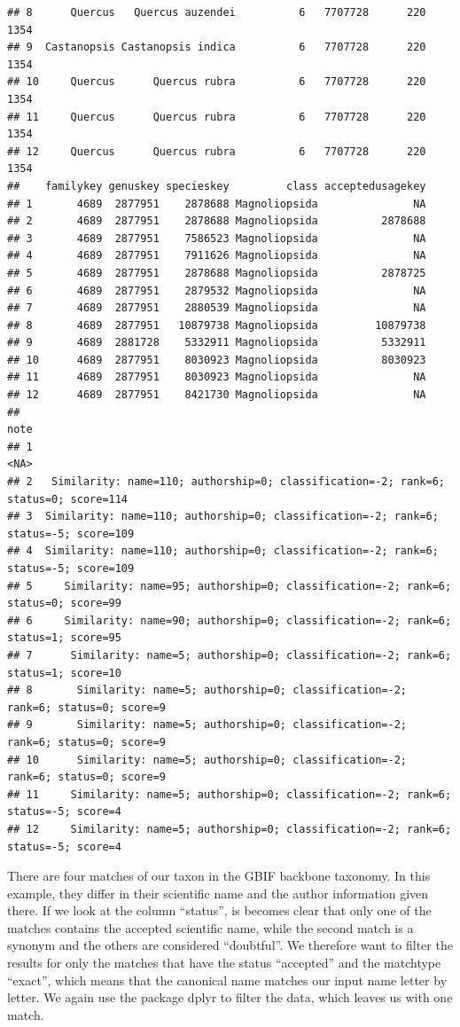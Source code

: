 \documentclass[
]{book}
\begin{document}
\begin{verbatim}
## 8      Quercus   Quercus auzendei          6   7707728      220     1354
## 9  Castanopsis Castanopsis indica          6   7707728      220     1354
## 10     Quercus      Quercus rubra          6   7707728      220     1354
## 11     Quercus      Quercus rubra          6   7707728      220     1354
## 12     Quercus      Quercus rubra          6   7707728      220     1354
##    familykey genuskey specieskey         class acceptedusagekey
## 1       4689  2877951    2878688 Magnoliopsida               NA
## 2       4689  2877951    2878688 Magnoliopsida          2878688
## 3       4689  2877951    7586523 Magnoliopsida               NA
## 4       4689  2877951    7911626 Magnoliopsida               NA
## 5       4689  2877951    2878688 Magnoliopsida          2878725
## 6       4689  2877951    2879532 Magnoliopsida               NA
## 7       4689  2877951    2880539 Magnoliopsida               NA
## 8       4689  2877951   10879738 Magnoliopsida         10879738
## 9       4689  2881728    5332911 Magnoliopsida          5332911
## 10      4689  2877951    8030923 Magnoliopsida          8030923
## 11      4689  2877951    8030923 Magnoliopsida               NA
## 12      4689  2877951    8421730 Magnoliopsida               NA
##                                                                                   note
## 1                                                                                 <NA>
## 2   Similarity: name=110; authorship=0; classification=-2; rank=6; status=0; score=114
## 3  Similarity: name=110; authorship=0; classification=-2; rank=6; status=-5; score=109
## 4  Similarity: name=110; authorship=0; classification=-2; rank=6; status=-5; score=109
## 5     Similarity: name=95; authorship=0; classification=-2; rank=6; status=0; score=99
## 6     Similarity: name=90; authorship=0; classification=-2; rank=6; status=1; score=95
## 7      Similarity: name=5; authorship=0; classification=-2; rank=6; status=1; score=10
## 8       Similarity: name=5; authorship=0; classification=-2; rank=6; status=0; score=9
## 9       Similarity: name=5; authorship=0; classification=-2; rank=6; status=0; score=9
## 10      Similarity: name=5; authorship=0; classification=-2; rank=6; status=0; score=9
## 11     Similarity: name=5; authorship=0; classification=-2; rank=6; status=-5; score=4
## 12     Similarity: name=5; authorship=0; classification=-2; rank=6; status=-5; score=4
\end{verbatim}

There are four matches of our taxon in the GBIF backbone taxonomy. In this example, they differ in their scientific name and the author information given there. If we look at the column ``status'', is becomes clear that only one of the matches contains the accepted scientific name, while the second match is a synonym and the others are considered ``doubtful''. We therefore want to filter the results for only the matches that have the status ``accepted'' and the matchtype ``exact'', which means that the canonical name matches our input name letter by letter. We again use the package dplyr to filter the data, which leaves us with one match.
\end{document}

